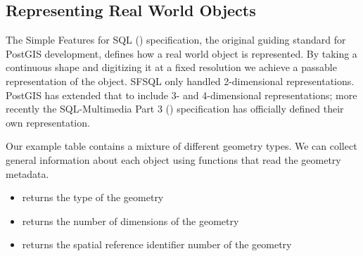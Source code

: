 \documentclass[a4paper,11pt,english]{sphinxmanual}
\begin{document}
\subsection{Representing Real World Objects}
\label{\detokenize{basic:representing-real-world-objects}}
The Simple Features for SQL ({\hyperref[\detokenize{glossary:term-sfsql}]{}}) specification, the original guiding standard for PostGIS development, defines how a real world object is represented.  By taking a continuous shape and digitizing it at a fixed resolution we achieve a passable representation of the object.  SFSQL only handled 2-dimensional representations.  PostGIS has extended that to include 3- and 4-dimensional representations; more recently the SQL-Multimedia Part 3 ({\hyperref[\detokenize{glossary:term-sql-mm}]{}}) specification has officially defined their own representation.

Our example table contains a mixture of different geometry types. We can collect general information about each object using functions that read the geometry metadata.
\begin{itemize}
\item {} 
 returns the type of the geometry

\item {} 
 returns the number of dimensions of the geometry

\item {} 
 returns the spatial reference identifier number of the geometry

\end{itemize}

\begin{sphinxVerbatim}[commandchars=\\\{\}]
    
   
\end{sphinxVerbatim}
\end{document}
